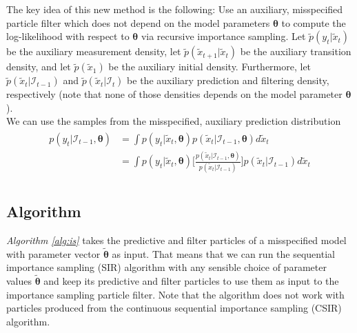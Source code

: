 \documentclass[11pt, oneside]{scrreprt}   	%
\begin{document}
The key idea of this new method is the following: Use an auxiliary, misspecified particle filter which does not depend on the model parameters $\boldsymbol{\theta}$ to compute the log-likelihood with respect to $\boldsymbol{\theta}$ via recursive importance sampling. Let $\tilde{p}(y_t | \tilde{x}_{t})$ be the auxiliary measurement density, let $\tilde{p}(\tilde{x}_{t+1} | \tilde{x}_{t})$ be the auxiliary transition density, and let $\tilde{p}(\tilde{x}_1)$ be the auxiliary initial density. Furthermore, let $\tilde{p}(\tilde{x}_{t} | \mathcal{I}_{t-1})$ and  $\tilde{p}(\tilde{x}_{t} | \mathcal{I}_{t})$ be the auxiliary prediction and filtering density, respectively (note that none of those densities depends on the model parameter $\boldsymbol{\theta}$).\\

We can use the samples from the misspecified, auxiliary prediction distribution 
\begin{align} 
\begin{split}
p(y_t | \mathcal{I}_{t-1}, \boldsymbol{\theta}) &= \int p(y_t | \tilde{x}_t, \boldsymbol{\theta}) p(\tilde{x}_t | \mathcal{I}_{t-1}, \boldsymbol{\theta}) d \tilde{x}_t \\
&= \int p(y_t | \tilde{x}_t, \boldsymbol{\theta}) \bigg[ \frac{p(\tilde{x}_t | \mathcal{I}_{t-1}, \boldsymbol{\theta})}{p(\tilde{x}_t | \mathcal{I}_{t-1})} \bigg] p(\tilde{x}_t | \mathcal{I}_{t-1}) d \tilde{x}_t \\
\end{split}					
\end{align}  

\subsection{Algorithm}
\textit{Algorithm \ref{alg:is}} takes the predictive and filter particles of a misspecified model with parameter vector $\boldsymbol{\tilde{\theta}}$ as input. That means that we can run the sequential importance sampling (SIR) algorithm with any sensible choice of parameter values $\boldsymbol{\tilde{\theta}}$ and keep its predictive and filter particles to use them as input to the importance sampling particle filter. Note that the algorithm does not work with particles produced from the continuous sequential importance sampling (CSIR) algorithm.\\
\end{document}
